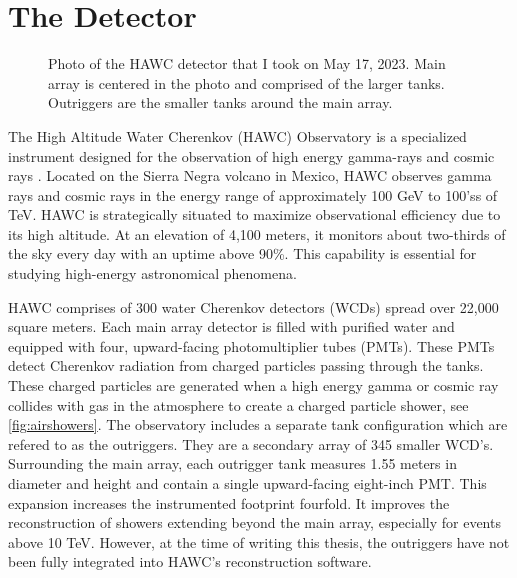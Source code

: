 \section{The Detector}

\begin{figure}[h!]
    \caption{Photo of the HAWC detector that I took on May 17, 2023. Main array is centered in the photo and comprised of the larger tanks. Outriggers are the smaller tanks around the main array.}
    \label{fig:HAWC}
\end{figure}

The High Altitude Water Cherenkov (HAWC) Observatory is a specialized instrument designed for the observation of high energy gamma-rays and cosmic rays \cite{HAWC_NIM}.
Located on the Sierra Negra volcano in Mexico, HAWC observes gamma rays and cosmic rays in the energy range of approximately 100 GeV to 100'ss of TeV.
HAWC is strategically situated to maximize observational efficiency due to its high altitude.
At an elevation of 4,100 meters, it monitors about two-thirds of the sky every day with an uptime above 90\%.
This capability is essential for studying high-energy astronomical phenomena.

HAWC comprises of 300 water Cherenkov detectors (WCDs) spread over 22,000 square meters.
Each main array detector is filled with purified water and equipped with four, upward-facing photomultiplier tubes (PMTs).
These PMTs detect Cherenkov radiation from charged particles passing through the tanks.
These charged particles are generated when a high energy gamma or cosmic ray collides with gas in the atmosphere to create a charged particle shower, see \cref{fig:airshowers}.
The observatory includes a separate tank configuration which are refered to as the outriggers.
They are a secondary array of 345 smaller WCD's.
Surrounding the main array, each outrigger tank measures 1.55 meters in diameter and height and contain a single upward-facing eight-inch PMT.
This expansion increases the instrumented footprint fourfold.
It improves the reconstruction of showers extending beyond the main array, especially for events above 10 TeV.
However, at the time of writing this thesis, the outriggers have not been fully integrated into HAWC's reconstruction software.

